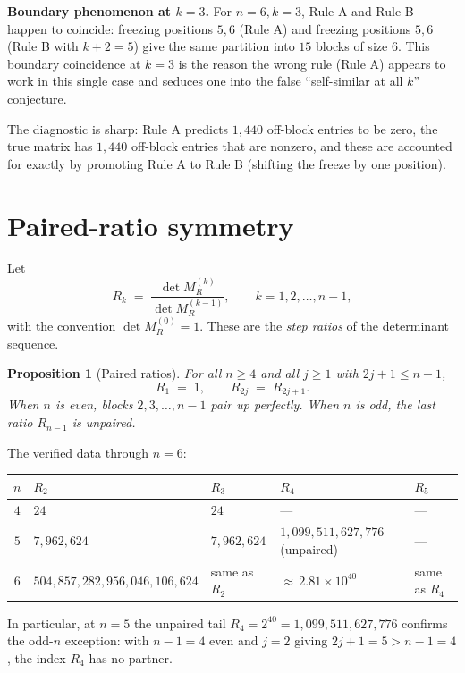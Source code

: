 \documentclass[11pt]{article}
\newtheorem{proposition}[theorem]{Proposition}
\theoremstyle{definition}
\begin{document}
\textbf{Boundary phenomenon at $k=3$.} For $n = 6, k = 3$, Rule A and Rule B happen to coincide: freezing positions $5,6$ (Rule A) and freezing positions $5,6$ (Rule B with $k+2 = 5$) give the same partition into $15$ blocks of size $6$. This boundary coincidence at $k = 3$ is the reason the wrong rule (Rule A) appears to work in this single case and seduces one into the false ``self-similar at all $k$'' conjecture.

The diagnostic is sharp: Rule A predicts $1{,}440$ off-block entries to be zero, the true matrix has $1{,}440$ off-block entries that are nonzero, and these are accounted for exactly by promoting Rule A to Rule B (shifting the freeze by one position).

\section{Paired-ratio symmetry}

Let
\[
R_k \;=\; \frac{\det M_R^{(k)}}{\det M_R^{(k-1)}}, \qquad k = 1,2,\dots,n-1,
\]
with the convention $\det M_R^{(0)} = 1$. These are the \emph{step ratios} of the determinant sequence.

\begin{proposition}[Paired ratios]
\label{prop:paired}
For all $n \ge 4$ and all $j \ge 1$ with $2j+1 \le n-1$,
\[
R_1 \;=\; 1, \qquad R_{2j} \;=\; R_{2j+1}.
\]
When $n$ is even, blocks $2,3,\dots,n-1$ pair up perfectly. When $n$ is odd, the last ratio $R_{n-1}$ is unpaired.
\end{proposition}

The verified data through $n = 6$:

\medskip
\begin{center}
\begin{tabular}{|c|l|l|l|l|}
\hline
$n$ & $R_2$ & $R_3$ & $R_4$ & $R_5$ \\
\hline
$4$ & $24$ & $24$ & --- & --- \\
$5$ & $7{,}962{,}624$ & $7{,}962{,}624$ & $1{,}099{,}511{,}627{,}776$ (unpaired) & --- \\
$6$ & $504{,}857{,}282{,}956{,}046{,}106{,}624$ & same as $R_2$ & ${\approx}\,2.81 \times 10^{40}$ & same as $R_4$ \\
\hline
\end{tabular}
\end{center}
\medskip

In particular, at $n = 5$ the unpaired tail $R_4 = 2^{40} = 1{,}099{,}511{,}627{,}776$ confirms the odd-$n$ exception: with $n - 1 = 4$ even and $j = 2$ giving $2j+1 = 5 > n - 1 = 4$, the index $R_4$ has no partner.
\end{document}
